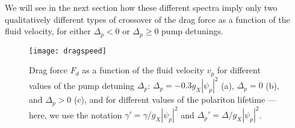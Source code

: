 We will see in the next section how these different spectra imply only
two qualitatively different types of crossover of the drag force as a
function of the fluid velocity, for either $\Delta_p < 0$ or
$\Delta_p \ge 0$ pump detunings.

%
\begin{figure}[tb]\centering
\texttt{[image: dragspeed]} %
\caption{
%
Drag force $F_d$ as a function of the fluid velocity
$v_p$ for different values of the pump detuning $\Delta_p$:
$\Delta_p=-0.3g_X|\psi_p|^2$ (a), $\Delta_p=0$ (b), and $\Delta_p>0$
(c), and for different values of the polariton lifetime --- here, we
use the notation $\gamma' = \gamma/g_X|\psi_p|^2$ and $\Delta_p' =
\Delta/g_X|\psi_p|^2$.
%
}\label{fig:dragv}
\end{figure}


